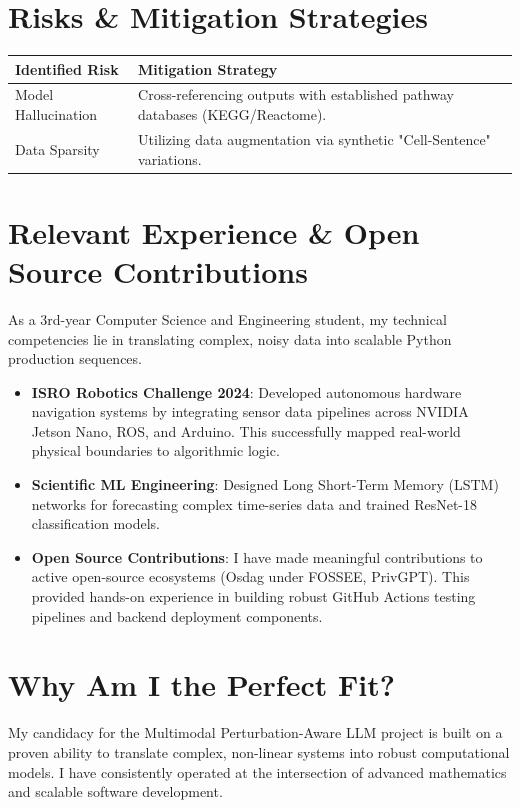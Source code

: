 \documentclass[12pt,a4paper]{article}
\begin{document}
\section{Risks \& Mitigation Strategies}
\begin{table}[h!]
\centering
\begin{tabular}{@{}ll@{}}
\toprule
\textbf{Identified Risk} & \textbf{Mitigation Strategy} \\ \midrule
Model Hallucination & Cross-referencing outputs with established pathway databases (KEGG/Reactome). \\
Data Sparsity & Utilizing data augmentation via synthetic "Cell-Sentence" variations. \\ \bottomrule
\end{tabular}
\end{table}

\section{Relevant Experience \& Open Source Contributions}
As a 3rd-year Computer Science and Engineering student, my technical competencies lie in translating complex, noisy data into scalable Python production sequences.

\begin{itemize}
    \item \textbf{ISRO Robotics Challenge 2024}: Developed autonomous hardware navigation systems by integrating sensor data pipelines across NVIDIA Jetson Nano, ROS, and Arduino. This successfully mapped real-world physical boundaries to algorithmic logic.
    \item \textbf{Scientific ML Engineering}: Designed Long Short-Term Memory (LSTM) networks for forecasting complex time-series data and trained ResNet-18 classification models.
    \item \textbf{Open Source Contributions}: I have made meaningful contributions to active open-source ecosystems (Osdag under FOSSEE, PrivGPT). This provided hands-on experience in building robust GitHub Actions testing pipelines and backend deployment components.
\end{itemize}

\section{Why Am I the Perfect Fit?}
My candidacy for the Multimodal Perturbation-Aware LLM project is built on a proven ability to translate complex, non-linear systems into robust computational models. I have consistently operated at the intersection of advanced mathematics and scalable software development.
\end{document}
